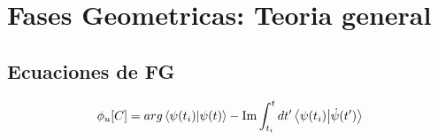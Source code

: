 \chapter{Fases Geometricas: Teoria general}
\label{ch1_fg}


\pagestyle{fancy}
\fancyhf{}
\fancyhead[LE]{\nouppercase{\rightmark\hfill}}
\fancyhead[RO]{\nouppercase{\leftmark\hfill}}
\fancyfoot[LE,RO]{\hfill\thepage\hfill}

\section{Ecuaciones de FG}

\begin{equation}\label{ec:fg_u_cinematica}
    \phi_u[C]=arg \bra{\psi(t_i)}\ket{\psi(t)}-\Im \int_{t_i}^{t} dt' \bra{\psi(t_i)}\ket{\dot \psi(t')}
\end{equation}